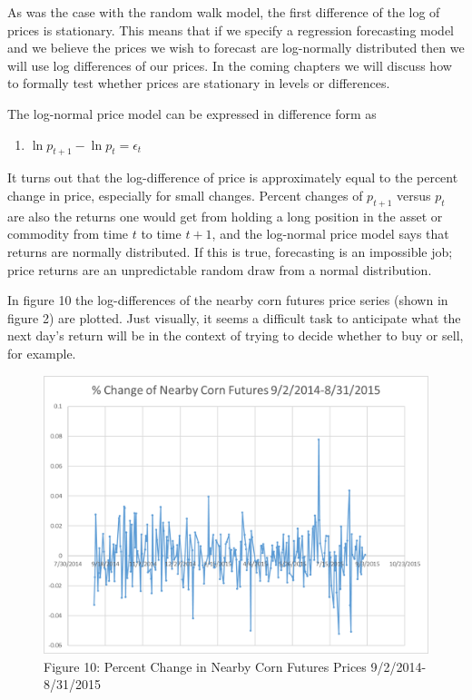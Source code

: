 \documentclass[]{book}
\providecommand{\tightlist}{%
  \setlength{\itemsep}{0pt}\setlength{\parskip}{0pt}}
\theoremstyle{definition}
\theoremstyle{definition}
\theoremstyle{remark}
\begin{document}
As was the case with the random walk model, the first difference of the
log of prices is stationary. This means that if we specify a regression
forecasting model and we believe the prices we wish to forecast are
log-normally distributed then we will use log differences of our prices.
In the coming chapters we will discuss how to formally test whether
prices are stationary in levels or differences.

The log-normal price model can be expressed in difference form as

\begin{enumerate}
\def\labelenumi{(\arabic{enumi})}
\setcounter{enumi}{6}
\tightlist
\item
  \(\ln{p_{t+1}} - \ln{p_{t}} = \epsilon_t\)
\end{enumerate}

It turns out that the log-difference of price is approximately equal to
the percent change in price, especially for small changes. Percent
changes of \(p_{t+1}\) versus \(p_t\) are also the returns one would get
from holding a long position in the asset or commodity from time \(t\)
to time \(t+1\), and the log-normal price model says that returns are
normally distributed. If this is true, forecasting is an impossible job;
price returns are an unpredictable random draw from a normal
distribution.

In figure 10 the log-differences of the nearby corn futures price series
(shown in figure 2) are plotted. Just visually, it seems a difficult
task to anticipate what the next day's return will be in the context of
trying to decide whether to buy or sell, for example.

\begin{figure}[htbp]
\centering
\includegraphics{Excel-files/IntroductiontoCommodityTS-Nearby_construct_files/image002.png}
\caption{Figure 10: Percent Change in Nearby Corn Futures Prices
9/2/2014-8/31/2015}
\end{figure}
\end{document}
